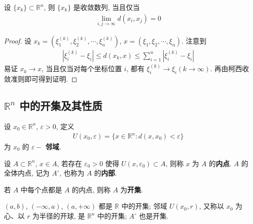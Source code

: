 \documentclass[../../main.tex]{subfiles}
\begin{document}
\begin{proposition}
设 $\{x_k\} \subset \mathbb{R}^n$, 则 $\{x_k\}$ 是收敛数列, 当且仅当
\begin{align*}
\lim_{i, j \to \infty} d(x_i, x_j) = 0
\end{align*} 
\end{proposition}
\begin{proof}
设 $x_k = (\xi_1^{(k)}, \xi_2^{(k)}, \cdots, \xi_n^{(k)})$, $x = (\xi_1, \xi_2, \cdots, \xi_n)$. 注意到
\begin{align*}
|\xi_i^{(k)} - \xi_i| \leqslant d(x_k, x) \leqslant \sum_{i = 1}^{n}|\xi_i^{(k)} - \xi_i|
\end{align*}
易证 $x_k \to x$, 当且仅当对每个坐标位置 $i$, 都有 $\xi_i^{(k)} \to \xi_i (k \to \infty)$. 再由柯西收敛准则即可得到证明.
\end{proof}

\subsection{$\mathbb{R}^n$ 中的开集及其性质} 

\begin{definition}[邻域、内点、内部和开集]
设 $x_0 \in \mathbb{R}^n$, $\varepsilon > 0$, 定义
\begin{align*}
U(x_0, \varepsilon) = \{x \in \mathbb{R}^n : d(x, x_0) < \varepsilon\}
\end{align*}
为 $x_0$ 的 $\varepsilon -$ \textbf{邻域}.

设 $A \subset \mathbb{R}^n$, $x \in A$, 若存在 $\varepsilon_0 > 0$ 使得 $U(x, \varepsilon_0) \subset A$, 则称 $x$ 为 $A$ 的\textbf{内点}. $A$ 的全体内点, 记为 $A^\circ$, 也称为 $A$ 的\textbf{内部}.

若 $A$ 中每个点都是 $A$ 的内点, 则称 $A$ 为\textbf{开集}.
\end{definition}
\begin{note}
$(a, b)$, $(-\infty, a)$, $(a, +\infty)$ 都是 $\mathbb{R}$ 中的开集; 邻域 $U(x_0, r)$, 又称以 $x_0$ 为心、以 $r$ 为半径的开球, 是 $\mathbb{R}^n$ 中的开集; $A^\circ$ 也是开集.
\end{note}
\end{document}
